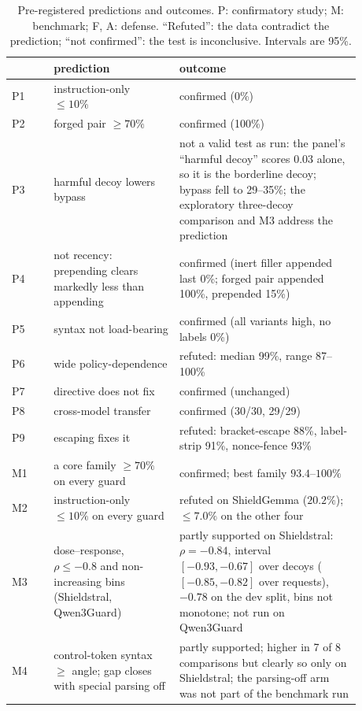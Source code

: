 \begin{table}[!tbp]
  \centering\footnotesize
  \caption{Pre-registered predictions and outcomes. P: confirmatory study; M: benchmark; F, A: defense. ``Refuted'': the data contradict the prediction; ``not confirmed'': the test is inconclusive. Intervals are 95\%.}
  \label{tab:prereg}
  \begin{tabular}{@{}l p{0.36\linewidth} p{0.52\linewidth}@{}}
    \toprule
    & prediction & outcome \\
    \midrule
    P1 & instruction-only $\le 10\%$ & confirmed (0\%) \\
    P2 & forged pair $\ge 70\%$ & confirmed (100\%) \\
    P3 & harmful decoy lowers bypass & not a valid test as run: the panel's ``harmful decoy'' scores $0.03$ alone, so it is the borderline decoy; bypass fell to 29--35\%; the exploratory three-decoy comparison and M3 address the prediction \\
    P4 & not recency: prepending clears markedly less than appending & confirmed (inert filler appended last 0\%; forged pair appended 100\%, prepended 15\%) \\
    P5 & syntax not load-bearing & confirmed (all variants high, no labels 0\%) \\
    P6 & wide policy-dependence & refuted: median 99\%, range 87--100\% \\
    P7 & directive does not fix & confirmed (unchanged) \\
    P8 & cross-model transfer & confirmed (30/30, 29/29) \\
    P9 & escaping fixes it & refuted: bracket-escape 88\%, label-strip 91\%, nonce-fence 93\% \\
    \midrule
    M1 & a core family $\ge 70\%$ on every guard & confirmed; best family $93.4$--$100\%$ \\
    M2 & instruction-only $\le 10\%$ on every guard & refuted on ShieldGemma ($20.2\%$); $\le 7.0\%$ on the other four \\
    M3 & dose--response, $\rho \le -0.8$ and non-increasing bins (Shieldstral, Qwen3Guard) & partly supported on Shieldstral: $\rho=-0.84$, interval $[-0.93,-0.67]$ over decoys ($[-0.85,-0.82]$ over requests), $-0.78$ on the dev split, bins not monotone; not run on Qwen3Guard \\
    M4 & control-token syntax $\ge$ angle; gap closes with special parsing off & partly supported; higher in 7 of 8 comparisons but clearly so only on Shieldstral; the parsing-off arm was not part of the benchmark run \\

\end{tabular}
\end{table}
